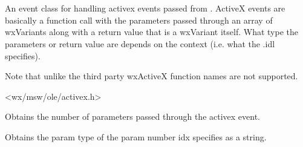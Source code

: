 
\section{}\label{wxactivexevent}

An event class for handling activex events passed from
. ActiveX events are basically
a function call with the parameters passed through an array of wxVariants along
with a return value that is a wxVariant itself. What type the parameters or
return value are depends on the context (i.e. what the .idl specifies).

Note that unlike the third party wxActiveX function names are not supported.




<wx/msw/ole/activex.h>


\twocolwidtha{7cm}
\begin{twocollist}\itemsep=0pt
\end{twocollist}


\label{wxactivexeventparamcount}


Obtains the number of parameters passed through the activex event.


\label{wxactivexeventparamtype}


Obtains the param type of the param number idx specifies as a string.


